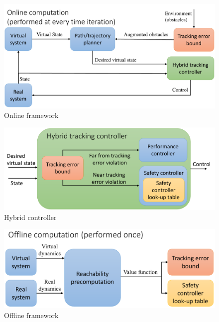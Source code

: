 \begin{figure}[h!]
\includegraphics[width=\columnwidth]{fig/framework_online}
\caption{Online framework}
\label{fig:fw_online}
\end{figure}

\begin{figure}[h!]
  \includegraphics[width=\columnwidth]{fig/hybrid_controller}
  \caption{Hybrid controller}
  \label{fig:hybrid_ctrl}
\end{figure}

\begin{figure}[h!]
  \includegraphics[width=\columnwidth]{fig/framework_offline}
  \caption{Offline framework}
  \label{fig:fw_offline}
\end{figure}